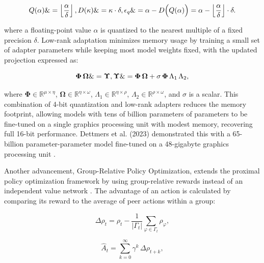 \documentclass{svproc}
\begin{document}
\begin{equation}
  Q(\alpha) \&= \left\lfloor \frac{\alpha}{\delta} \right\rfloor,\\
  D(\kappa) \&= \kappa \cdot \delta, \\
  \epsilon_{q} \&= \alpha - D\Bigl(Q(\alpha)\Bigr) = \alpha - \left\lfloor \frac{\alpha}{\delta} \right\rfloor \cdot \delta.
\end{equation}

\noindent where a floating-point value \(\alpha\) is quantized to the nearest multiple of a fixed precision \(\delta\). Low-rank adaptation minimizes memory usage by training a small set of adapter parameters while keeping most model weights fixed, with the updated projection expressed as:


\begin{equation}
  \boldsymbol{\Phi}\,\boldsymbol{\Omega} \&= \boldsymbol{\Upsilon}, \\
  \boldsymbol{\Upsilon} \&= \boldsymbol{\Phi}\,\boldsymbol{\Omega} + \sigma\,\boldsymbol{\Phi}\,\Lambda_1\,\Lambda_2,
\end{equation}

\noindent where \(\boldsymbol{\Phi} \in \mathbb{R}^{\mu \times \eta}\), \(\boldsymbol{\Omega} \in \mathbb{R}^{\eta \times \omega}\), \(\Lambda_1 \in \mathbb{R}^{\eta \times \rho}\), \(\Lambda_2 \in \mathbb{R}^{\rho \times \omega}\), and \(\sigma\) is a scalar. This combination of 4-bit quantization and low-rank adapters reduces the memory footprint, allowing models with tens of billion parameters of parameters to be fine-tuned on a single graphics processing unit with modest memory, recovering full 16-bit performance. Dettmers et al. (2023) demonstrated this with a 65-billion parameter-parameter model fine-tuned on a 48-gigabyte graphics processing unit \cite{dettmers2023qloraefficientfinetuningquantized}.

Another advancement, Group-Relative Policy Optimization, extends the proximal policy optimization framework by using group-relative rewards instead of an independent value network \cite{schulman2017proximalpolicyoptimizationalgorithms}. The advantage of an action is calculated by comparing its reward to the average of peer actions within a group:


\begin{equation}
  \Delta \rho_t = \rho_t - \frac{1}{|\Gamma_t|} \sum_{\varphi \in \Gamma_t} \rho_\varphi,
\end{equation}

\begin{equation}
  \hat{A}_t = \sum_{k=0}^{\infty} \gamma^k\, \Delta \rho_{t+k},
\end{equation}
\end{document}
